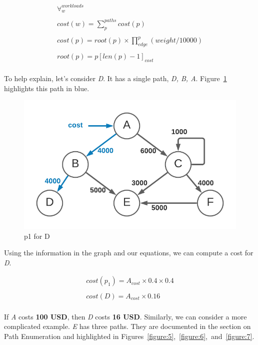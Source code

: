 \documentclass[10pt, a4paper, twocolumn]{article}
\begin{document}
      \begin{gather*}
        \forall^{workloads}_{w} \\
        \\
        cost(w) = \sum^{paths}_{p} cost(p) \\
        \\
        cost(p) = root(p) \times \prod^{p}_{edge} (weight / 10000) \\
        \\
        root(p) = p[len(p) - 1]_{cost} \\
      \end{gather*}

      To help explain, let's consider \textit{D}.
      It has a single path, \textit{D, B, A}.
      Figure~\ref{figure:4} highlights this path in blue.

      \begin{figure}[H]
        \centering
        \includegraphics[width=\linewidth]{./cost-attribution-cost-d.png}
        \caption{p1 for D}
        \label{figure:4}
      \end{figure}

      Using the information in the graph and our equations, we can compute a cost for \textit{D}.

      \begin{gather*}
        cost(p_{1}) = A_{cost} \times 0.4 \times 0.4 \\
        \\
        cost(D) = A_{cost} \times 0.16 \\
      \end{gather*}

      If \textit{A} costs \textbf{100 USD}, then \textit{D} costs \textbf{16 USD}.
      Similarly, we can consider a more complicated example.
      \textit{E} has three paths.
      They are documented in the section on Path Enumeration and
      highlighted in Figures~\ref{figure:5},~\ref{figure:6},~and~\ref{figure:7}.
\end{document}
